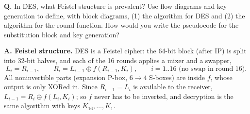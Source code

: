 \begin{worked}
\textbf{Q.} In DES, what Feistel structure is prevalent? Use flow diagrams and key generation to define, with block diagrams, (1) the algorithm for DES and (2) the algorithm for the round function. How would you write the pseudocode for the substitution block and key generation?

\textbf{A. Feistel structure.} DES is a Feistel cipher: the 64-bit block (after IP) is split into 32-bit halves, and each of the 16 rounds applies a mixer and a swapper,
\[
L_i = R_{i-1}, \qquad R_i = L_{i-1} \oplus f(R_{i-1}, K_i), \qquad i = 1..16 \text{ (no swap in round 16).}
\]
All noninvertible parts (expansion P-box, $6 \to 4$ S-boxes) are inside $f$, whose output is only XORed in. Since $R_{i-1} = L_i$ is available to the receiver, $L_{i-1} = R_i \oplus f(L_i, K_i)$; so $f$ never has to be inverted, and decryption is the same algorithm with keys $K_{16}, \dots, K_1$.


\end{worked}
